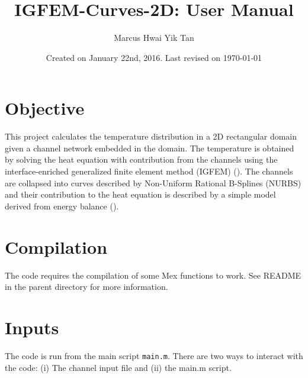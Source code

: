 \documentclass[11pt,letterpaper]{article}
\title{IGFEM-Curves-2D: User Manual}
\author{Marcus Hwai Yik Tan }
\date{Created on January 22nd, 2016. Last revised on \today}
\renewcommand\cite[1]{(\citet{#1})}
\begin{document}
\maketitle

\section{Objective}
This project calculates the temperature distribution in a 2D rectangular domain given a channel network embedded in the domain. The temperature is obtained by solving the heat equation with contribution from the channels using the interface-enriched generalized finite element method (IGFEM) \cite{Soghrati12_2D}.  The channels are collapsed into curves described by Non-Uniform Rational B-Splines (NURBS) and their contribution to the heat equation is described by a simple model derived from energy balance \cite{Tan15,Tan16}. 

\section{Compilation}
The code requires the compilation of some Mex functions to work. See README in the parent directory for more information. 

\section{Inputs}
The code is run from the main script \texttt{main.m}. There are two ways to interact with the code: (i) The channel input file and (ii) the main.m script.
\end{document}
